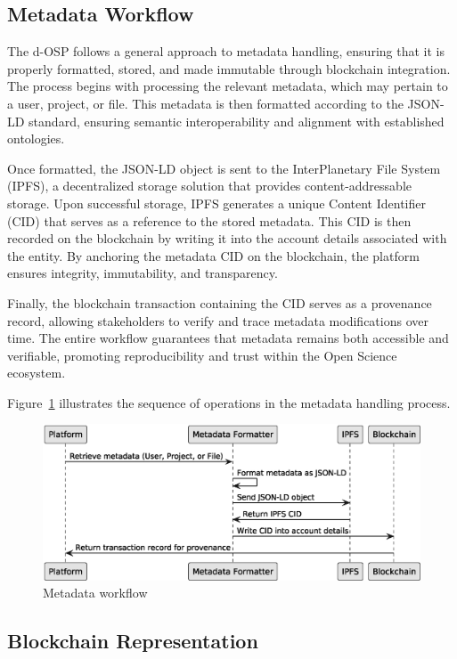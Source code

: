 \documentclass[final]{rc-book-2.14}
\begin{document}
\subsection{Metadata Workflow}

The d-OSP follows a general approach to metadata handling, ensuring that it is properly formatted, stored, and made immutable through blockchain integration. The process begins with processing the relevant metadata, which may pertain to a user, project, or file. This metadata is then formatted according to the JSON-LD standard, ensuring semantic interoperability and alignment with established ontologies.

Once formatted, the JSON-LD object is sent to the InterPlanetary File System (IPFS), a decentralized storage solution that provides content-addressable storage. Upon successful storage, IPFS generates a unique Content Identifier (CID) that serves as a reference to the stored metadata. This CID is then recorded on the blockchain by writing it into the account details associated with the entity. By anchoring the metadata CID on the blockchain, the platform ensures integrity, immutability, and transparency.

Finally, the blockchain transaction containing the CID serves as a provenance record, allowing stakeholders to verify and trace metadata modifications over time. The entire workflow guarantees that metadata remains both accessible and verifiable, promoting reproducibility and trust within the Open Science ecosystem.

Figure~\ref{fig:metadata_workflow} illustrates the sequence of operations in the metadata handling process.


\begin{figure}[htbp]
    \centering
    \includegraphics[scale=0.5]{fig/metadata_workflow_sequence.eps}
    \caption{Metadata workflow}
    \label{fig:metadata_workflow}
\end{figure}

\subsection{Blockchain Representation}
\end{document}
